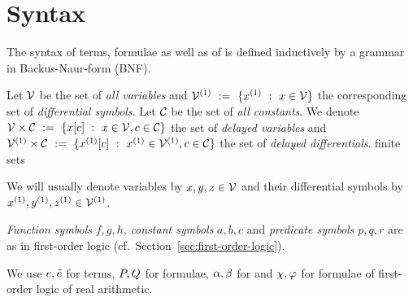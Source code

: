 \section{Syntax}
    \label{sec:syntax}

    The syntax of \ddL terms, formulae as well as of \dHPs is defined inductively by a grammar in Backus-Naur-form (BNF).

    Let $\mathcal{V}$ be the set of \emph{all variables} and $\diffvars\defeq\{\D{x} \with x\in\allvars\}$ the corresponding set of \emph{differential symbols}.
    Let $\mathcal{C}_{}$ be the set of \emph{all constants}. We denote $\mathcal{V}\times\mathcal{C}_{}~\mathrel{\mathop{:}}=~\{x[c] ~\mathrel{\mathop{:}}~ x\in\mathcal{V}, c\in\mathcal{C}_{}\}$ the set of \emph{delayed variables} and $\delaydiffvars\defeq\{\Dx[c] \with \D{x}\in\diffvars, c\in\constants\}$ the set of \emph{delayed differentials}.
    finite sets

    We will usually denote variables by $x,y,z\in\mathcal{V}$ and their differential symbols by $\D{x},\D{y},\D{z}\in\diffvars$.

    \emph{Function symbols} $f,g,h$, \emph{constant symbols} $a,b,c$ and \emph{predicate symbols} $p,q,r$ are as in first-order logic (cf.\ Section~\ref{sec:first-order-logic}).

    We use $e,\tilde{e}$ for \ddL terms, $P,Q$ for \ddL formulae, $\alpha,\beta$ for \dHPs and $\chi,\varphi$ for formulae of first-order logic of real arithmetic.

